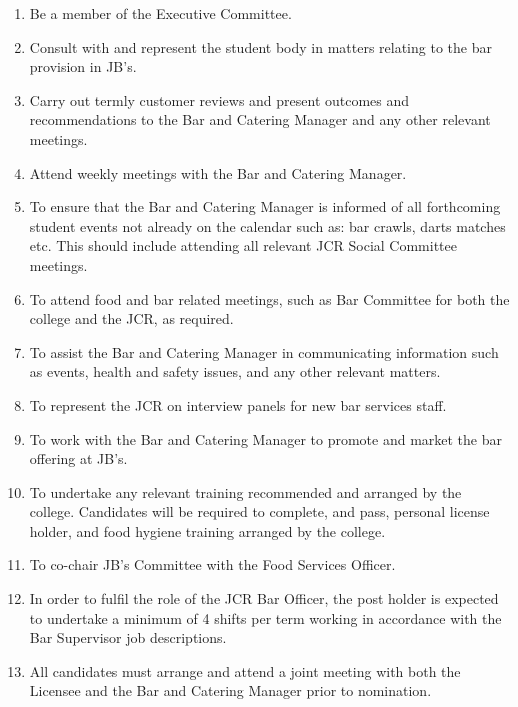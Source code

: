\begin{enumerate}
    \item Be a member of the Executive Committee.
    \item Consult with and represent the student body in matters relating to the bar provision in JB’s. 
    \item Carry out termly customer reviews and present outcomes and recommendations to the Bar and Catering Manager and any other relevant meetings. 
    \item Attend weekly meetings with the Bar and Catering Manager.
    \item To ensure that the Bar and Catering Manager is informed of all forthcoming student events not already on the calendar such as: bar crawls, darts matches etc. This should include attending all relevant JCR Social Committee meetings.
    \item To attend food and bar related meetings, such as Bar Committee for both the college and the JCR, as required.
    \item To assist the Bar and Catering Manager in communicating information such as events, health and safety issues, and any other relevant matters.
    \item To represent the JCR on interview panels for new bar services staff. 
    \item To work with the Bar and Catering Manager to promote and market the bar offering at JB’s. 
    \item To undertake any relevant training recommended and arranged by the college. Candidates will be required to complete, and pass, personal license holder, and food hygiene training arranged by the college. 
    \item To co-chair JB’s Committee with the Food Services Officer.
    \item In order to fulfil the role of the JCR Bar Officer, the post holder is expected to undertake a minimum of 4 shifts per term working in accordance with the Bar Supervisor job descriptions. 
    \item All candidates must arrange and attend a joint meeting with both the Licensee and the Bar and Catering Manager prior to nomination.
\end{enumerate}

